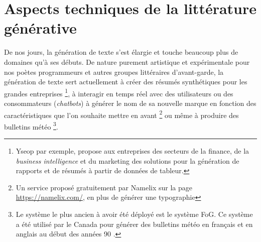 \documentclass{article}
\begin{document}
	\section{Aspects techniques de la littérature générative}\label{aspects_tech}
		De nos jours, la génération de texte s'est élargie et touche beaucoup plus de domaines qu'à ses débuts. De nature purement artistique et expérimentale pour nos poètes programmeurs et autres groupes littéraires d'avant-garde, la génération de texte sert actuellement à créer des résumés synthétiques pour les grandes entreprises \footnote{Yseop par exemple, propose aux entreprises des secteurs de la finance, de la \textit{business intelligence} et du marketing des solutions pour la génération de rapports et de résumés à partir de données de tableur.}, à interagir en temps réel avec des utilisateurs ou des consommateurs (\textit{chatbots}) à générer le nom de sa nouvelle marque en fonction des caractéristiques que l'on souhaite  mettre en avant \footnote{Un service proposé gratuitement par Namelix sur la page \href{https://namelix.com/}{https://namelix.com/}, en plus de générer une typographie} ou même à produire des bulletins météo \footnote{Le système le plus ancien à avoir été déployé est le système FoG. Ce système a été utilisé par le Canada pour générer des bulletins météo en français et en anglais au début des années 90 \autocite{wiki:fog}.}.\\
		
\end{document}
